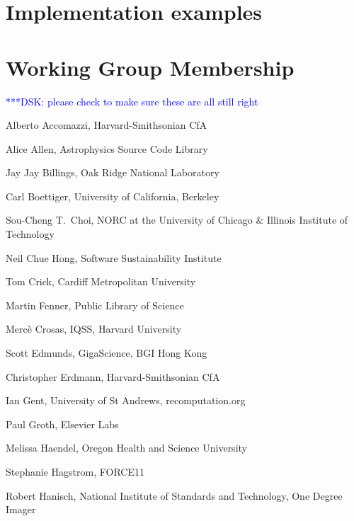 \documentclass[11pt, oneside]{amsart}
\newcommand{\katznote}[1]{ {\textcolor{blue} { ***DSK: #1 }}} %
\newcommand{\dmnote}[1]{ {\textcolor{purple} { ***DM: #1 }}} %
\newcommand{\LJHnote}[1]{ {\textcolor{fuschsia} { ***LJH: #1 }}} %
\begin{document}

\section{Implementation examples}
\label{sec:examples}




\appendix

\section{Working Group Membership}
\label{app:wg_members}

\katznote{please check to make sure these are all still right}

Alberto Accomazzi, Harvard-Smithsonian CfA

Alice Allen, Astrophysics Source Code Library

Jay Jay Billings, Oak Ridge National Laboratory

Carl Boettiger, University of California,  Berkeley

Sou-Cheng T.~Choi, NORC at the University of Chicago \& Illinois Institute of Technology

Neil Chue Hong, Software Sustainability Institute

Tom Crick, Cardiff Metropolitan University

Martin Fenner, Public Library of Science

Merc\`e Crosas, IQSS, Harvard University

Scott Edmunds, GigaScience, BGI Hong Kong

Christopher Erdmann, Harvard-Smithsonian CfA

Ian Gent, University of St Andrews, recomputation.org

Paul Groth, Elsevier Labs

Melissa Haendel, Oregon Health and Science University

Stephanie Hagstrom, FORCE11

Robert Hanisch, National Institute of Standards and Technology, One Degree Imager
\end{document}
